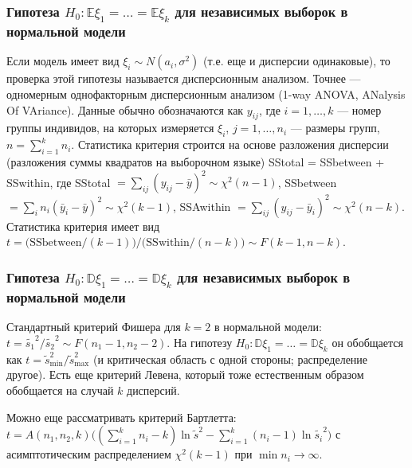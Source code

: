 \documentclass[12 pt]{article}
\def\E{\mathbb{E}}
\def\D{\mathbb{D}}
\begin{document}
\subsubsection*{Гипотеза $H_0: \E\xi_1 = \ldots = \E\xi_k$ для независимых выборок в нормальной модели}
Если модель имеет вид $\xi_i \sim N(a_i,\sigma^2)$ (т.е. еще и дисперсии одинаковые), то проверка этой
гипотезы называется дисперсионным анализом. Точнее --- одномерным однофакторным дисперсионным анализом
(1-way ANOVA, ANalysis Of VAriance).  Данные обычно обозначаются как
$y_{ij}$, где $i=1,\ldots,k$ --- номер группы индивидов, на которых измеряется  $\xi_i$,
$j=1,\ldots,n_i$ --- размеры групп, $n=\sum_{i=1}^k n_i$.  Статистика критерия строится на основе разложения дисперсии
(разложения суммы квадратов на выборочном языке) SStotal = SSbetween + SSwithin, где
SStotal $= \sum_{ij} (y_{ij} - \bar{y})^2\sim \chi^2(n-1)$, SSbetween $= \sum_{i} n_i (\bar{y}_i - \bar{y})^2 \sim \chi^2(k-1)$,
SSAwithin $= \sum_{ij} (y_{ij} - \bar{y}_i)^2 \sim \chi^2(n-k)$.
Статистика критерия имеет вид\\ $t=\Big(\mbox{SSbetween}/(k-1)\Big) / \Big(\mbox{SSwithin}/(n - k)\Big)\sim F(k-1, n-k)$.

\subsubsection*{Гипотеза $H_0:\D\xi_1 = \ldots = \D\xi_k$ для независимых выборок в нормальной модели}

Стандартный критерий Фишера для $k=2$ в нормальной модели: $t=\widetilde{s_1}^2/\widetilde{s_2}^2\sim F(n_1-1,n_2-2)$.
На гипотезу $H_0:\D\xi_1 = \ldots = \D\xi_k$ он обобщается как $t=\widetilde{s}_{\mbox{min}}^2/\widetilde{s}_{\mbox{max}}^2$
(и критическая область с одной стороны; распределение другое).
Есть еще критерий Левена, который тоже естественным образом обобщается на случай $k$ дисперсий.

Можно еще рассматривать критерий Бартлетта:\\
$t = A(n_1,n_2,k) \Big((\sum_{i=1}^k n_i -k)\ln \widetilde{s}^2 - \sum_{i=1}^k (n_i-1) \ln \widetilde{s_i}^2\Big)$
с асимптотическим распределением $\chi^2(k-1)$ при $\min n_i \rightarrow \infty$.

\newpage
\end{document}
